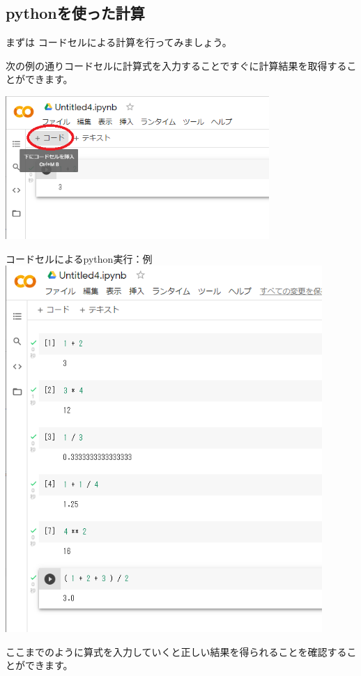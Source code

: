 \documentclass[11pt,a4paper,dvipdfmx,titlepage]{jsreport}
\begin{document}
\subsection{pythonを使った計算}

 まずは {\gt コードセル}による計算を行ってみましょう。


次の例の通りコードセルに計算式を入力することですぐに計算結果を取得することができます。

\includegraphics[width=10cm]{images/colab05.png}

\begin{grabox}{コードセルによるpython実行：例}
\includegraphics[width=12cm]{images/colab06.png}
\end{grabox}

ここまでのように算式を入力していくと正しい結果を得られることを確認することができます。
\end{document}
